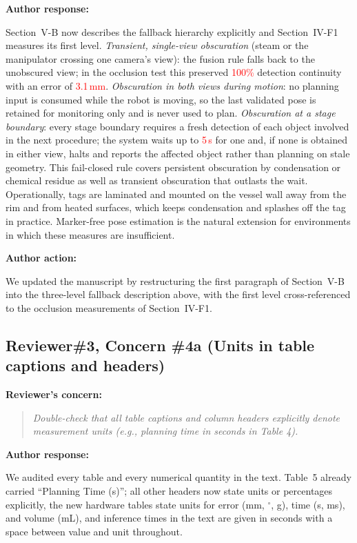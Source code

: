 \documentclass[11pt]{article}
\newcommand{\nd}[1]{\textcolor{red}{#1}}
\newif\ifshowstatus
\newcommand{\statusline}[2]{\ifshowstatus\par\noindent\textcolor{status#1}{\textbf{Status: \MakeUppercase{#1}.} #2}\par\smallskip\fi}
\newenvironment{concern}[3][pending]{\subsection*{\ifshowstatus\textcolor{status#1}{#2}\else#2\fi}\statusline{#1}{#3}\textbf{Reviewer's concern:}\begin{quote}\itshape}{\end{quote}}
\newenvironment{response}{\textbf{Author response:}\par\smallskip}{\par\medskip}
\newenvironment{action}{\textbf{Author action:}\par\smallskip}{\par\bigskip\noindent\hrulefill\par\bigskip}
\begin{document}
\begin{response}
Section~V-B now describes the fallback hierarchy explicitly and Section~IV-F1 measures its first level.
\emph{Transient, single-view obscuration} (steam or the manipulator crossing one camera's view): the fusion rule falls back to the unobscured view; in the occlusion test this preserved \nd{100\%} detection continuity with an error of \nd{3.1\,mm}.
\emph{Obscuration in both views during motion}: no planning input is consumed while the robot is moving, so the last validated pose is retained for monitoring only and is never used to plan.
\emph{Obscuration at a stage boundary}: every stage boundary requires a fresh detection of each object involved in the next procedure; the system waits up to \nd{5\,s} for one and, if none is obtained in either view, halts and reports the affected object rather than planning on stale geometry.
This fail-closed rule covers persistent obscuration by condensation or chemical residue as well as transient obscuration that outlasts the wait.
Operationally, tags are laminated and mounted on the vessel wall away from the rim and from heated surfaces, which keeps condensation and splashes off the tag in practice.
Marker-free pose estimation is the natural extension for environments in which these measures are insufficient.
\end{response}

\begin{action}
We updated the manuscript by restructuring the first paragraph of Section~V-B into the three-level fallback description above, with the first level cross-referenced to the occlusion measurements of Section~IV-F1.
\end{action}

\begin{concern}[complete]{Reviewer\#3, Concern \#4a (Units in table captions and headers)}{Editorial only; apply the unit audit in access\_revised.tex.}
Double-check that all table captions and column headers explicitly denote measurement units (e.g., planning time in seconds in Table 4).
\end{concern}

\begin{response}
We audited every table and every numerical quantity in the text.
Table~5 already carried ``Planning Time (s)''; all other headers now state units or percentages explicitly, the new hardware tables state units for error (mm, $^\circ$, g), time (s, ms), and volume (mL), and inference times in the text are given in seconds with a space between value and unit throughout.
\end{response}
\end{document}
